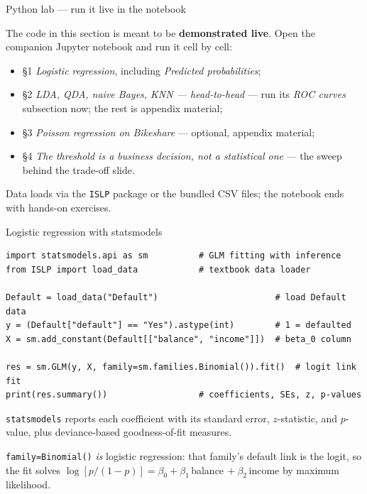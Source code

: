 \documentclass[aspectratio=169,11pt]{beamer}
\begin{document}
\begin{frame}{Python lab --- run it live in the notebook}
  \begin{labnote}
    The code in this section is meant to be \textbf{demonstrated live}. Open the companion Jupyter notebook and run it cell by cell:
    \begin{itemize}
      \item \S1 \emph{Logistic regression}, including \emph{Predicted probabilities};
      \item \S2 \emph{LDA, QDA, naive Bayes, KNN --- head-to-head} --- run its \emph{ROC curves} subsection now; the rest is appendix material;
      \item \S3 \emph{Poisson regression on Bikeshare} --- optional, appendix material;
      \item \S4 \emph{The threshold is a business decision, not a statistical one} --- the sweep behind the trade-off slide.
    \end{itemize}
    Data loads via the \texttt{ISLP} package or the bundled CSV files; the notebook ends with hands-on exercises.
  \end{labnote}
\end{frame}



\begin{frame}[fragile]{Logistic regression with statsmodels}
  \begin{lstlisting}
import statsmodels.api as sm          # GLM fitting with inference
from ISLP import load_data            # textbook data loader

Default = load_data("Default")                       # load Default data
y = (Default["default"] == "Yes").astype(int)        # 1 = defaulted
X = sm.add_constant(Default[["balance", "income"]])  # beta_0 column

res = sm.GLM(y, X, family=sm.families.Binomial()).fit()  # logit link fit
print(res.summary())                  # coefficients, SEs, z, p-values
  \end{lstlisting}
  \texttt{statsmodels} reports each coefficient with its standard
  error, $z$-statistic, and $p$-value, plus deviance-based
  goodness-of-fit measures.
  \begin{readme}
    \texttt{family=Binomial()} \emph{is} logistic regression: that family's
    default link is the logit, so the fit solves
    $\log[p/(1-p)]=\beta_0+\beta_1\,$balance$\,+\beta_2\,$income by
    maximum likelihood.
  \end{readme}
\end{frame}
\end{document}
